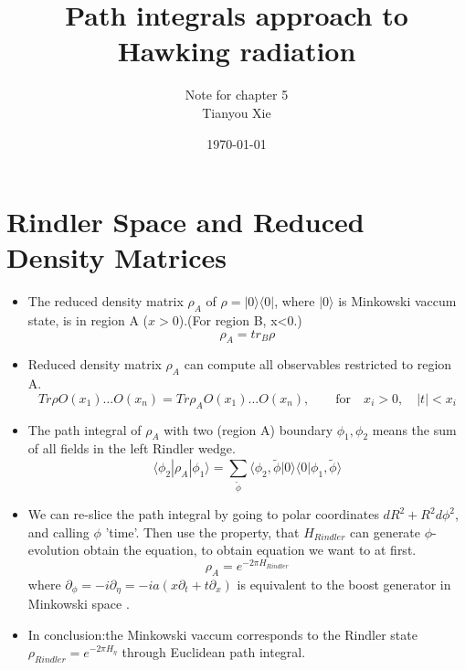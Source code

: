 \documentclass{article}
\def\beq{\begin{eqnarray}}
\def\eeq{\end{eqnarray}}
\def\beq{\begin{equation}}
\def\eeq{\end{equation}}
\begin{document}
\title{Path integrals approach to Hawking radiation}
\author{ Note for chapter 5 \\Tianyou Xie}
\date{\today}
\maketitle


\section{Rindler Space and Reduced Density Matrices}
\begin{itemize}

\item{The reduced density matrix $\rho_{A}$ of $\rho=|0\rangle\langle0|$, where $|0\rangle$ is Minkowski vaccum state, is in region A ($x>0$).(For region B, x<0.)
\beq
\rho_{A}=tr_{B}\rho
\eeq }
\item{Reduced density matrix $\rho_{A}$ can compute all observables restricted to region A.
\beq
Tr\rho O(x_{1})...O(x_{n})=Tr\rho_{A}O(x_{1})...O(x_{n}),\qquad\mbox{for}\quad x_{i}>0,\quad|t|<x_{i}
\eeq
}
\item{The path integral of $\rho_{A}$ with two (region A) boundary $\phi_{1},\phi_{2}$ means the sum of all fields in the left Rindler wedge.
\beq
\langle\phi_{2}|\rho_{A}|\phi_{1} \rangle=\sum_{\tilde{\phi}}\langle \phi_{2},\tilde{\phi}  | 0  \rangle \langle 0 | \phi_{1},\tilde{\phi}\rangle
\eeq
}
\item{We can re-slice the path integral by going to polar coordinates $dR^{2}+R^{2}d\phi^{2}$, and calling $\phi$ 'time'. Then use the property, that $H_{Rindler}$ can generate $\phi$-evolution  obtain the equation}, to obtain equation we want to at first.
    \beq
    \rho_{A}=e^{-2\pi H_{Rindler}}
    \eeq
    where $ \partial_\phi=-i \partial_\eta =-ia(x\partial_{t}+t\partial_{x})$ is equivalent to the boost generator in Minkowski space .
    \item{ In conclusion:the Minkowski vaccum corresponds to the Rindler state $\rho_{Rindler}=e^{-2\pi H_{\eta}}$ through Euclidean path integral.}
\end{itemize}
\end{document}
